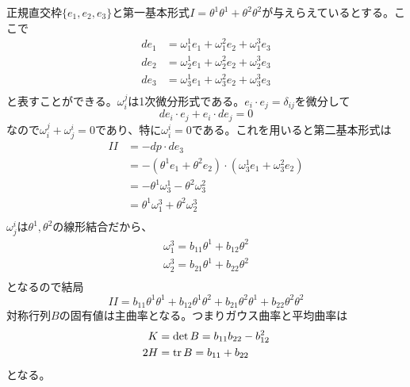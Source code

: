         正規直交枠$\{e_1, e_2, e_3\}$と第一基本形式$I = \theta^1\theta^1 + \theta^2\theta^2$が与えらえているとする。ここで
        \begin{align*}
            de_1 &= \omega^1_1e_1 + \omega^2_1e_2 + \omega^3_1e_3\\
            de_2 &= \omega^1_2e_1 + \omega^2_2e_2 + \omega^3_2e_3\\
            de_3 &= \omega^1_3e_1 + \omega^2_3e_2 + \omega^3_3e_3\\
        \end{align*}
        と表すことができる。$\omega_i^j$は1次微分形式である。$e_i \cdot e_j = \delta_{ij}$を微分して
            \[de_i \cdot e_j + e_i \cdot de_j = 0\]
        なので$\omega_i^j + \omega_j^i = 0$であり、特に$\omega_i^i = 0$である。これを用いると第二基本形式は
        \begin{align*}
            II &= -dp \cdot de_3\\
            &= - (\theta^1e_1 + \theta^2e_2) \cdot (\omega^1_3e_1 + \omega^2_3e_2)\\
            &= - \theta^1\omega^1_3 - \theta^2\omega^2_3\\
            &= \theta^1\omega^3_1 + \theta^2\omega^3_2\\
        \end{align*}
        $\omega^i_j$は$\theta^1, \theta^2$の線形結合だから、
        \begin{align*}
            \omega^3_1 = b_{11}\theta^1 + b_{12}\theta^2\\
            \omega^3_2 = b_{21}\theta^1 + b_{22}\theta^2\\
        \end{align*}
        となるので結局
            \[II = b_{11}\theta^1\theta^1 + b_{12}\theta^1\theta^2 + b_{21}\theta^2\theta^1 + b_{22}\theta^2\theta^2\]
        対称行列$B$の固有値は主曲率となる。つまりガウス曲率と平均曲率は
        \begin{align*}
            K &= \det B = b_{11}b_{22} - b_{12}^2\\
            2H &= \mathrm{tr}\, B = b_{11} + b_{22}\\
        \end{align*}
        となる。

